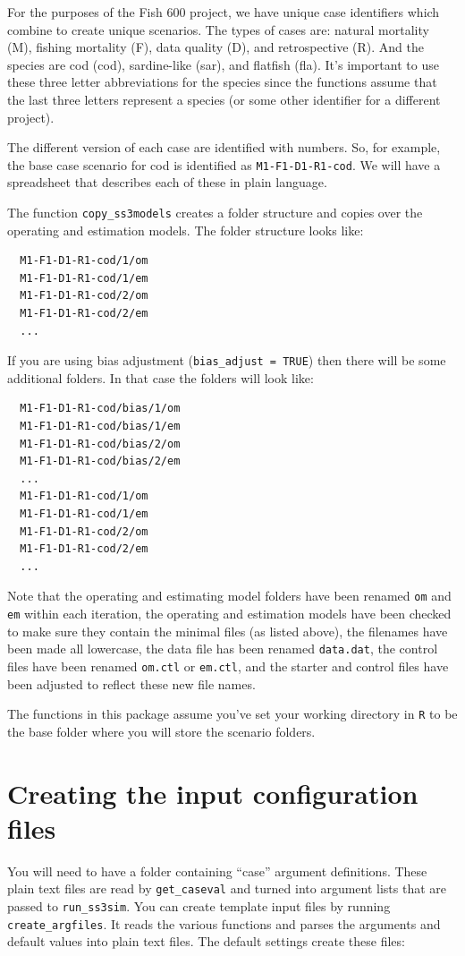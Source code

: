 \documentclass[12pt]{article}
\begin{document}
For the purposes of the Fish 600 project, we have unique case identifiers which 
combine to create unique scenarios. The types of cases are: natural mortality 
(M), fishing mortality (F), data quality (D), and retrospective (R). And the 
species are cod (cod), sardine-like (sar), and flatfish (fla). It's important 
to use these three letter abbreviations for the species since the functions 
assume that the last three letters represent a species (or some other 
identifier for a different project).

The different version of each case are identified with numbers. So, for 
example, the base case scenario for cod is identified as 
\texttt{M1-F1-D1-R1-cod}. We will have a spreadsheet that describes each of 
these in plain language.

The function \texttt{copy\_ss3models} creates a folder structure and copies 
over the operating and estimation models. The folder structure looks like:

\begin{verbatim}
  M1-F1-D1-R1-cod/1/om
  M1-F1-D1-R1-cod/1/em
  M1-F1-D1-R1-cod/2/om
  M1-F1-D1-R1-cod/2/em
  ...
\end{verbatim}

\noindent
If you are using bias adjustment (\texttt{bias\_adjust = TRUE}) then there 
will be some additional folders. In that case the folders will look like:

\begin{verbatim}
  M1-F1-D1-R1-cod/bias/1/om
  M1-F1-D1-R1-cod/bias/1/em
  M1-F1-D1-R1-cod/bias/2/om
  M1-F1-D1-R1-cod/bias/2/em
  ...
  M1-F1-D1-R1-cod/1/om
  M1-F1-D1-R1-cod/1/em
  M1-F1-D1-R1-cod/2/om
  M1-F1-D1-R1-cod/2/em
  ...
\end{verbatim}

\noindent
Note that the operating and estimating model folders have been renamed
\texttt{om} and \texttt{em} within each iteration, the operating and estimation 
models have been checked to make sure they contain the minimal files (as listed 
above), the filenames have been made all lowercase, the data file has been 
renamed \texttt{data.dat}, the control files have been renamed \texttt{om.ctl} 
or \texttt{em.ctl}, and the starter and control files have been adjusted to 
reflect these new file names.

The functions in this package assume you've set your working directory in 
\texttt{R} to be the base folder where you will store the scenario folders.

\section{Creating the input configuration files}
You will need to have a folder containing ``case'' argument definitions. These 
plain text files are read by \texttt{get\_caseval} and turned into argument 
lists that are passed to \texttt{run\_ss3sim}. You can create template input 
files by running \texttt{create\_argfiles}. It reads the various functions and 
parses the arguments and default values into plain text files. The default 
settings create these files:
\end{document}
